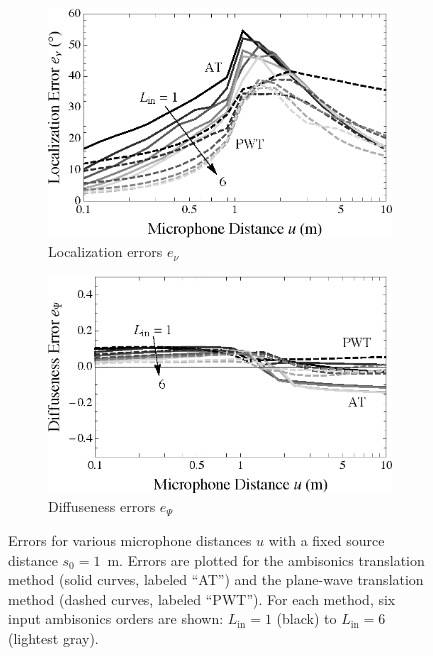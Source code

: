 \begin{figure}[t]
	\vspace{0.5cm}
	\begin{subfigure}[b]{0.49\textwidth}
        		\includegraphics[width=\textwidth]{07_characterization_extrapolation/figures/tylka2017_order.eps}
        		\caption{Localization errors $e_\nu$}
		\label{fig:07_Characterization_Extrapolation:Localization_Errors:Order}
    	\end{subfigure}
	\hfill
    	\begin{subfigure}[b]{0.49\textwidth}
        		\includegraphics[width=\textwidth]{07_characterization_extrapolation/figures/merimaa2005_d_order.eps}
        		\caption{Diffuseness errors $e_\Psi$}
		\label{fig:07_Characterization_Extrapolation:Diffuseness_Errors:Order}
    	\end{subfigure}
	
    	\caption[Order dependence plots for each extrapolation method.]{
	Errors for various microphone distances $u$ with a fixed source distance $s_0 = 1$~m.
	Errors are plotted for the ambisonics translation method (solid curves, labeled ``AT'') and the plane-wave translation method (dashed curves, labeled ``PWT'').
	For each method, six input ambisonics orders are shown: $L_\textrm{in} = 1$ (black) to $L_\textrm{in} = 6$ (lightest gray).}
    	\label{fig:07_Characterization_Extrapolation:Order_Errors}
\end{figure}

